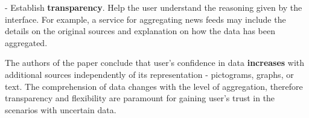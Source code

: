 \documentclass[12pt,letterpaper]{article}
\begin{document}
\hspace{10mm} - Establish \textbf{transparency}. Help the user understand the reasoning given by the interface. For example, a service for aggregating news feeds may include the details on the original sources and explanation on how the data has been aggregated. 

The authors of the paper conclude that user's confidence in data \textbf{increases} with additional sources independently of its representation - pictograms, graphs, or text. The comprehension of data changes with the level of aggregation, therefore transparency and flexibility are paramount for gaining user's trust in the scenarios with uncertain data. 

 

\end{document}
